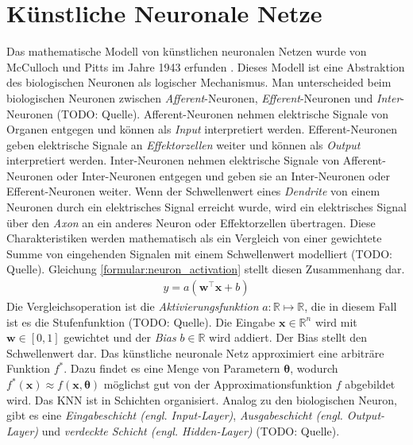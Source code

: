 \chapter{Künstliche Neuronale Netze}
Das mathematische Modell von künstlichen neuronalen Netzen wurde von McCulloch und Pitts im Jahre 1943 erfunden \cite{mcculloch1943logical}.
Dieses Modell ist eine Abstraktion des biologischen Neuronen als logischer Mechanismus.
Man unterscheided beim biologischen Neuronen zwischen \textit{Afferent}-Neuronen, \textit{Efferent}-Neuronen und \textit{Inter}-Neuronen (TODO: Quelle).
Afferent-Neuronen nehmen elektrische Signale von Organen entgegen und können als \textit{Input} interpretiert werden.
Efferent-Neuronen geben elektrische Signale an \textit{Effektorzellen} weiter und können als \textit{Output} interpretiert werden.
Inter-Neuronen nehmen elektrische Signale von Afferent-Neuronen oder Inter-Neuronen entgegen und geben sie an Inter-Neuronen oder Efferent-Neuronen weiter.
Wenn der Schwellenwert eines \textit{Dendrite} von einem Neuronen durch ein elektrisches Signal erreicht wurde, wird ein elektrisches Signal über den \textit{Axon} an ein anderes Neuron oder Effektorzellen übertragen.
Diese Charakteristiken werden mathematisch als ein Vergleich von einer gewichtete Summe von eingehenden Signalen mit einem Schwellenwert modelliert (TODO: Quelle).
Gleichung \ref{formular:neuron_activation} stellt diesen Zusammenhang dar.
\begin{align}
    \label{formular:neuron_activation}
    y = a(\textbf{w}^\intercal\textbf{x} + b)
\end{align}
Die Vergleichsoperation ist die \textit{Aktivierungsfunktion} $a: \mathbb{R}\mapsto\mathbb{R}$, die in diesem Fall ist es die Stufenfunktion (TODO: Quelle).
Die Eingabe $\textbf{x}\in\mathbb{R}^n$ wird mit $\textbf{w}\in[0, 1]$ gewichtet und der \textit{Bias} $b\in\mathbb{R}$ wird addiert. Der Bias stellt den Schwellenwert dar.
\newline
\newline
Das künstliche neuronale Netz approximiert eine arbiträre Funktion $f^*$. Dazu findet es eine Menge von Parametern $\boldsymbol\theta$, wodurch $f^*(\textbf{x})\approx f(\textbf{x}, \boldsymbol\theta)$
möglichst gut von der Approximationsfunktion $f$ abgebildet wird.
\newline
\newline
Das KNN ist in Schichten organisiert. Analog zu den biologischen Neuron, gibt es eine \textit{Eingabeschicht (engl. Input-Layer)},
\textit{Ausgabeschicht (engl. Output-Layer)} und \textit{verdeckte Schicht (engl. Hidden-Layer)} (TODO: Quelle).
